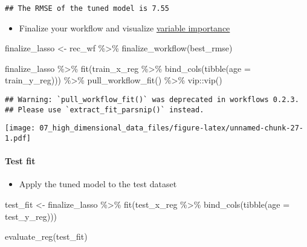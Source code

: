 \documentclass[
]{book}
\newenvironment{Shaded}{\begin{snugshade}}{\end{snugshade}}
\newcommand{\AttributeTok}[1]{\textcolor[rgb]{0.77,0.63,0.00}{#1}}
\newcommand{\FunctionTok}[1]{\textcolor[rgb]{0.00,0.00,0.00}{#1}}
\newcommand{\NormalTok}[1]{#1}
\newcommand{\OtherTok}[1]{\textcolor[rgb]{0.56,0.35,0.01}{#1}}
\newcommand{\SpecialCharTok}[1]{\textcolor[rgb]{0.00,0.00,0.00}{#1}}
\providecommand{\tightlist}{%
  \setlength{\itemsep}{0pt}\setlength{\parskip}{0pt}}
\begin{document}
\begin{verbatim}
## The RMSE of the tuned model is 7.55
\end{verbatim}

\begin{itemize}
\tightlist
\item
  Finalize your workflow and visualize \href{https://koalaverse.github.io/vip/articles/vip.html}{variable importance}
\end{itemize}

\begin{Shaded}
\begin{Highlighting}[]
\NormalTok{finalize\_lasso }\OtherTok{\textless{}{-}}\NormalTok{ rec\_wf }\SpecialCharTok{\%\textgreater{}\%}
  \FunctionTok{finalize\_workflow}\NormalTok{(best\_rmse)}

\NormalTok{finalize\_lasso }\SpecialCharTok{\%\textgreater{}\%}
  \FunctionTok{fit}\NormalTok{(train\_x\_reg }\SpecialCharTok{\%\textgreater{}\%} \FunctionTok{bind\_cols}\NormalTok{(}\FunctionTok{tibble}\NormalTok{(}\AttributeTok{age =}\NormalTok{ train\_y\_reg))) }\SpecialCharTok{\%\textgreater{}\%}
  \FunctionTok{pull\_workflow\_fit}\NormalTok{() }\SpecialCharTok{\%\textgreater{}\%}
\NormalTok{  vip}\SpecialCharTok{::}\FunctionTok{vip}\NormalTok{()}
\end{Highlighting}
\end{Shaded}

\begin{verbatim}
## Warning: `pull_workflow_fit()` was deprecated in workflows 0.2.3.
## Please use `extract_fit_parsnip()` instead.
\end{verbatim}

\texttt{[image: 07\_high\_dimensional\_data\_files/figure-latex/unnamed-chunk-27-1.pdf]}

\hypertarget{test-fit}{%
\paragraph{Test fit}\label{test-fit}}

\begin{itemize}
\tightlist
\item
  Apply the tuned model to the test dataset
\end{itemize}

\begin{Shaded}
\begin{Highlighting}[]
\NormalTok{test\_fit }\OtherTok{\textless{}{-}}\NormalTok{ finalize\_lasso }\SpecialCharTok{\%\textgreater{}\%}
  \FunctionTok{fit}\NormalTok{(test\_x\_reg }\SpecialCharTok{\%\textgreater{}\%} \FunctionTok{bind\_cols}\NormalTok{(}\FunctionTok{tibble}\NormalTok{(}\AttributeTok{age =}\NormalTok{ test\_y\_reg)))}

\FunctionTok{evaluate\_reg}\NormalTok{(test\_fit)}
\end{Highlighting}
\end{Shaded}
\end{document}
